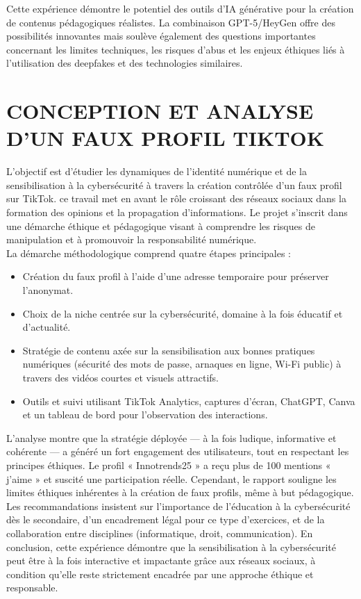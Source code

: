 \documentclass[12pt, a4em]{article}
\begin{document}
	Cette expérience démontre le potentiel des outils d'IA générative pour la création de contenus pédagogiques réalistes. La combinaison GPT-5/HeyGen offre des possibilités innovantes mais soulève également des questions importantes concernant les limites techniques, les risques d'abus et les enjeux éthiques liés à l'utilisation des deepfakes et des technologies similaires.
	
	
	\section{CONCEPTION ET ANALYSE D’UN FAUX PROFIL TIKTOK}
	
	 L’objectif est d’étudier les dynamiques de l’identité numérique et de la sensibilisation à la cybersécurité à travers la création contrôlée d’un faux profil sur TikTok.
	ce travail met en avant le rôle croissant des réseaux sociaux dans la formation des opinions et la propagation d’informations. Le projet s’inscrit dans une démarche éthique et pédagogique visant à comprendre les risques de manipulation et à promouvoir la responsabilité numérique.\\
	La démarche méthodologique comprend quatre étapes principales :
	
	\begin{itemize}
	\item Création du faux profil à l’aide d’une adresse temporaire pour préserver l’anonymat.
	\item 	Choix de la niche centrée sur la cybersécurité, domaine à la fois éducatif et d’actualité.
	\item Stratégie de contenu axée sur la sensibilisation aux bonnes pratiques numériques (sécurité des mots de passe, arnaques en ligne, Wi-Fi public) à travers des vidéos courtes et visuels attractifs.
	\item Outils et suivi utilisant TikTok Analytics, captures d’écran, ChatGPT, Canva et un tableau de bord pour l’observation des interactions.
	\end{itemize}
	L’analyse montre que la stratégie déployée — à la fois ludique, informative et cohérente — a généré un fort engagement des utilisateurs, tout en respectant les principes éthiques. Le profil « Innotrends25 » a reçu plus de 100 mentions « j’aime » et suscité une participation réelle. Cependant, le rapport souligne les limites éthiques inhérentes à la création de faux profils, même à but pédagogique.\\
	Les recommandations insistent sur l’importance de l’éducation à la cybersécurité dès le secondaire, d’un encadrement légal pour ce type d’exercices, et de la collaboration entre disciplines (informatique, droit, communication).
	En conclusion, cette expérience démontre que la sensibilisation à la cybersécurité peut être à la fois interactive et impactante grâce aux réseaux sociaux, à condition qu’elle reste strictement encadrée par une approche éthique et responsable.
	
\end{document}
